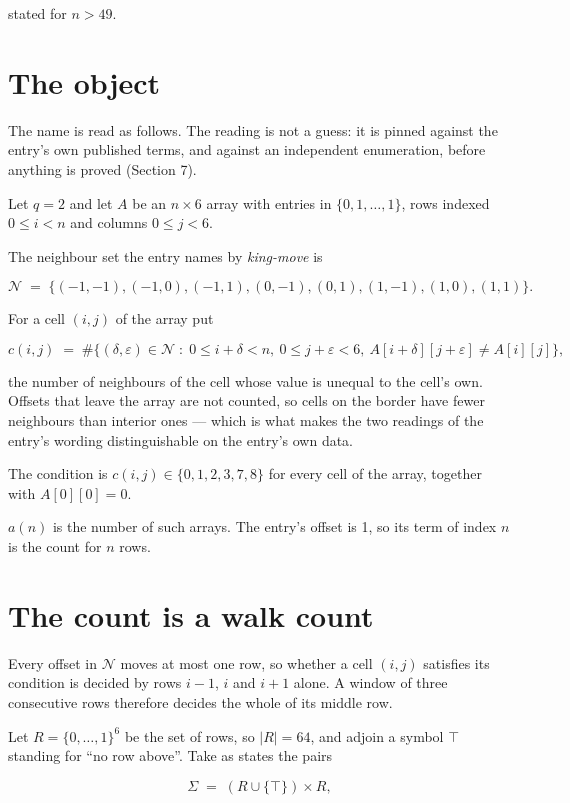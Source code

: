 \documentclass[11pt]{article}
\theoremstyle{definition}
\begin{document}
stated for $n > 49$.

\section{The object}

The name is read as follows. The reading is not a guess: it is pinned against the entry's own published terms, and against an independent enumeration, before anything is proved (Section 7).

Let $q = 2$ and let $A$ be an $n \times 6$ array with entries in $\{0,1,\dots,1\}$, rows indexed $0 \le i < n$ and columns $0 \le j < 6$.

The neighbour set the entry names by {\itshape king-move} is

\[\mathcal{N} \;=\; \{(-1,-1), (-1,0), (-1,1), (0,-1), (0,1), (1,-1), (1,0), (1,1)\}.\]

For a cell $(i,j)$ of the array put

\[c(i,j) \;=\; \#\bigl\{(\delta,\varepsilon)\in\mathcal{N} \;:\; 0\le i+\delta<n,\ 0\le j+\varepsilon<6,\ A[i+\delta][j+\varepsilon] \neq A[i][j]\bigr\},\]

the number of neighbours of the cell whose value is unequal to the cell's own. Offsets that leave the array are not counted, so cells on the border have fewer neighbours than interior ones --- which is what makes the two readings of the entry's wording distinguishable on the entry's own data.

The condition is $c(i,j) \in \{0, 1, 2, 3, 7, 8\}$ for every cell of the array, together with $A[0][0]=0$.

$a(n)$ is the number of such arrays. The entry's offset is 1, so its term of index $n$ is the count for $n$ rows.

\section{The count is a walk count}

Every offset in $\mathcal{N}$ moves at most one row, so whether a cell $(i,j)$ satisfies its condition is decided by rows $i-1$, $i$ and $i+1$ alone. A window of three consecutive rows therefore decides the whole of its middle row.

Let $R = \{0,\dots,1\}^{6}$ be the set of rows, so $|R| = 64$, and adjoin a symbol $\top$ standing for ``no row above''. Take as states the pairs

\[\Sigma \;=\; (R \cup \{\top\}) \times R,\]
\end{document}
